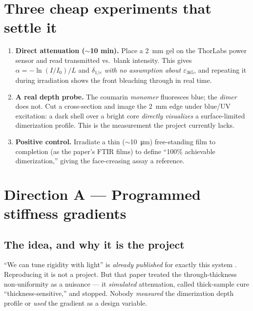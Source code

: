 \documentclass[11pt]{article}
\newcommand{\eps}{\varepsilon_{365}}
\begin{document}
\section{Three cheap experiments that settle it}\label{sec:experiments}
\begin{enumerate}[leftmargin=*]
  \item \textbf{Direct attenuation ($\sim$10 min).} Place a \SI{2}{mm} gel on the ThorLabs
  power sensor and read transmitted vs.\ blank intensity. This gives $\alpha=-\ln(I/I_0)/L$
  and $\delta_{1/e}$ \emph{with no assumption about $\eps$}, and repeating it during
  irradiation shows the front bleaching through in real time.
  \item \textbf{A real depth probe.} The coumarin \emph{monomer} fluoresces blue; the
  \emph{dimer} does not. Cut a cross-section and image the \SI{2}{mm} edge under
  blue/UV excitation: a dark shell over a bright core \emph{directly visualizes} a
  surface-limited dimerization profile. This is the measurement the project currently lacks.
  \item \textbf{Positive control.} Irradiate a thin ($\sim$\SI{10}{\micro m}) free-standing
  film to completion (as the paper's FTIR films) to define ``100\% achievable
  dimerization,'' giving the face-creasing assay a reference.
\end{enumerate}

\section{Direction A --- Programmed stiffness gradients}\label{sec:A}

\subsection{The idea, and why it is the project}
``We can tune rigidity with light'' is \emph{already published} for exactly this system
\cite{vanzanten2026}. Reproducing it is not a project. But that paper treated the
through-thickness non-uniformity as a nuisance --- it \emph{simulated} attenuation, called
thick-sample cure ``thickness-sensitive,'' and stopped. Nobody \emph{measured} the
dimerization depth profile or \emph{used} the gradient as a design variable.
\end{document}
